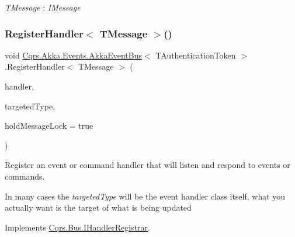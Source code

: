 \begin{Desc}
\item[Type Constraints]\begin{description}
\item[{\em T\+Message} : {\em I\+Message}]\end{description}
\end{Desc}
\mbox{\label{classCqrs_1_1Akka_1_1Events_1_1AkkaEventBus_a59ec3e497e511b73b5239eee80691443_a59ec3e497e511b73b5239eee80691443}} 
\subsubsection{\texorpdfstring{Register\+Handler$<$ T\+Message $>$()}{RegisterHandler< TMessage >()}\hspace{0.1cm}{\footnotesize\ttfamily [1/2]}}
{\footnotesize\ttfamily void \hyperlink{classCqrs_1_1Akka_1_1Events_1_1AkkaEventBus}{Cqrs.\+Akka.\+Events.\+Akka\+Event\+Bus}$<$ T\+Authentication\+Token $>$.Register\+Handler$<$ T\+Message $>$ (\begin{DoxyParamCaption}\item[{Action$<$ T\+Message $>$}]{handler,  }\item[{Type}]{targeted\+Type,  }\item[{bool}]{hold\+Message\+Lock = {\ttfamily true} }\end{DoxyParamCaption})}



Register an event or command handler that will listen and respond to events or commands. 

In many cases the {\itshape targeted\+Type}  will be the event handler class itself, what you actually want is the target of what is being updated 

Implements \hyperlink{interfaceCqrs_1_1Bus_1_1IHandlerRegistrar_ab6ca4dfdc54a5aeebe4651dbdb479f55_ab6ca4dfdc54a5aeebe4651dbdb479f55}{Cqrs.\+Bus.\+I\+Handler\+Registrar}.

